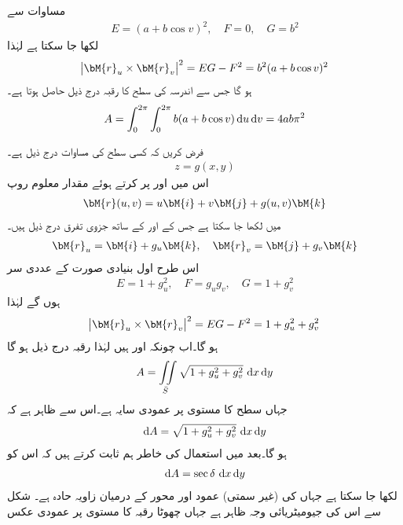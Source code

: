 مساوات  سے
\begin{align*}
E=(a+b\cos v)^2,\quad F=0,\quad G=b^2
\end{align*}
لکھا جا سکتا ہے لہٰذا
\begin{align*}
\abs{\bM{r}_u\times \bM{r}_v}^2=EG-F^2=b^2(a+b\cos v)^2
\end{align*}
ہو گا جس سے اندرسہ کی سطح کا رقبہ درج ذیل حاصل ہوتا ہے۔
\begin{align*}
A=\int_{0}^{2\pi}\int_0^{2\pi}b(a+b\cos v)\dif u\dif v=4ab\pi^2
\end{align*}

فرض کریں کہ کسی سطح کی مساوات درج ذیل ہے۔
\begin{align}
z=g(x,y)
\end{align}
اس میں  اور  پر کرتے ہوئے مقدار معلوم روپ
\begin{align}
\bM{r}(u,v)=u\bM{i}+v\bM{j}+g(u,v)\bM{k}
\end{align}
میں لکھا جا سکتا ہے جس کے  اور  کے ساتھ جزوی تفرق درج ذیل ہیں۔
\begin{align}\label{مساوات_خطی_تکمل_جزوی_تفرقات_الف}
\bM{r}_u=\bM{i}+g_u\bM{k},\quad \bM{r}_v=\bM{j}+g_v\bM{k}
\end{align}
اس طرح اول بنیادی صورت کے عددی سر
\begin{align*}
E=1+g_u^2,\quad F=g_ug_v,\quad G=1+g_v^2
\end{align*}
ہوں گے لہٰذا
\begin{align*}
\abs{\bM{r}_u\times \bM{r}_v}^2=EG-F^2=1+g_u^2+g_v^2
\end{align*}
ہو گا۔اب چونکہ  اور  ہیں  لہٰذا رقبہ درج ذیل ہو گا
\begin{align}\label{مساوات_خطی_تکمل_صریح_تفاعل_رقبہ_الف}
A=\iint\limits_{\bar{S}} \sqrt{1+g_u^2+g_v^2}\,\dif x\dif y
\end{align}
جہاں سطح  کا  مستوی پر عمودی سایہ  ہے۔اس سے ظاہر ہے کہ
\begin{align}\label{مساوات_خطی_تکمل_صریح_تفاعل_رقبہ_ب}
\dif A=\sqrt{1+g_u^2+g_v^2}\,\dif x\dif y
\end{align}
ہو گا۔بعد میں استعمال کی خاطر ہم ثابت کرتے ہیں کہ اس کو
\begin{align}\label{مساوات_خطی_تکمل_صریح_تفاعل_رقبہ_پ}
\dif A=\sec \delta \, \dif x\dif y
\end{align}
لکھا جا سکتا ہے جہاں  کی (غیر سمتی) عمود اور  محور کے درمیان زاویہ حادہ  ہے۔ شکل  سے اس کی جیومیٹریائی وجہ ظاہر ہے جہاں چھوٹا رقبہ  کا  مستوی پر عمودی عکس
